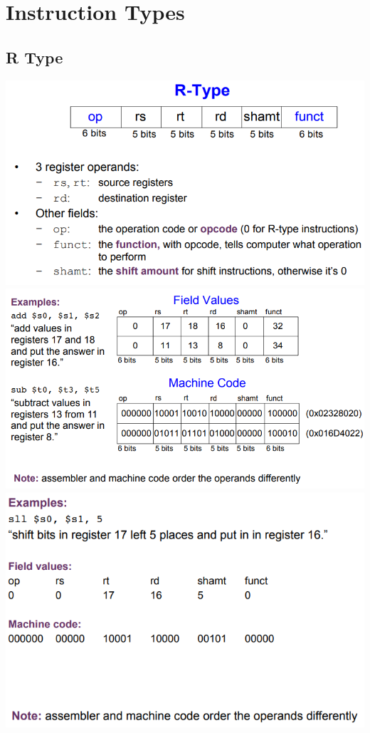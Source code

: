 \documentclass{article}[18pt]
\begin{document}
\section{Instruction Types}
\subsection{R Type}
\includegraphics[scale=0.7]{R-Type}\\
\includegraphics[scale=0.7]{R-Type1}\\
\includegraphics[scale=0.7]{R-Type2}
\end{document}

